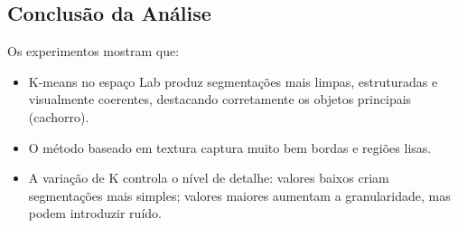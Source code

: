 \documentclass[../main.tex]{subfiles}
\begin{document}
\subsection{Conclusão da Análise}
Os experimentos mostram que:

\begin{itemize}
    \item K-means no espaço Lab produz segmentações mais limpas, estruturadas e visualmente coerentes, destacando corretamente os objetos principais (cachorro).
    \item O método baseado em textura captura muito bem bordas e regiões lisas.
    \item A variação de K controla o nível de detalhe: valores baixos criam segmentações mais simples; valores maiores aumentam a granularidade, mas podem introduzir ruído.
\end{itemize}
\end{document}
